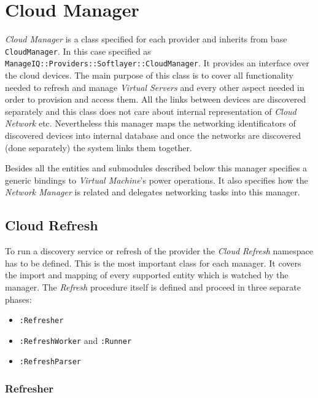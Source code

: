 
\clearpage
\section{Cloud Manager}
\label{sec:Cloud Manager}

\emph{Cloud Manager} is a class specified for each provider and inherits from base \texttt{CloudManager}. In this case specified as \texttt{ManageIQ::Providers::Softlayer::CloudManager}. It provides an interface over the cloud devices. The main purpose of this class is to cover all functionality needed to refresh and manage \emph{Virtual Servers} and every other aspect needed in order to provision and access them. All the links between devices are discovered separately and this class does not care about internal representation of \emph{Cloud Network} etc. Nevertheless this manager maps the networking identificators of discovered devices into internal database and once the networks are discovered (done separately) the system links them together.

Besides all the entities and submodules described below this manager specifies a generic bindings to \emph{Virtual Machine}'s power operations. It also specifies how the \emph{Network Manager} is related and delegates networking tasks into this manager.

\subsection{Cloud Refresh}
\label{sub:Cloud Refresh}

To run a discovery service or refresh of the provider the \emph{Cloud Refresh} namespace has to be defined. This is the most important class for each manager. It covers the import and mapping of every supported entity which is watched by the manager. The \emph{Refresh} procedure itself is defined and proceed in three separate phases:

\begin{itemize}
	\item \texttt{:Refresher}
	\item \texttt{:RefreshWorker} and \texttt{:Runner}
	\item \texttt{:RefreshParser}
\end{itemize}

\subsubsection{Refresher}
\label{subs:Refresher}

